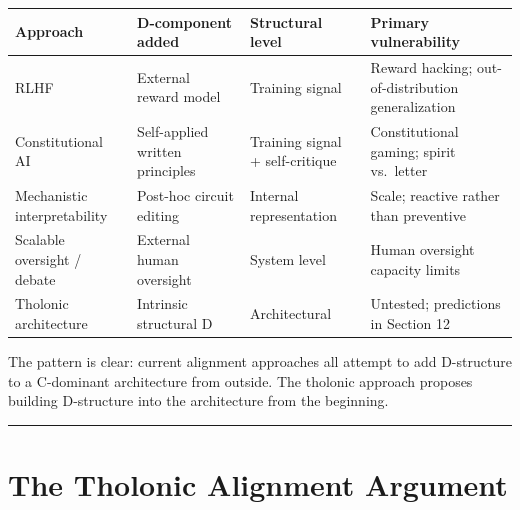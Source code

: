 \documentclass[12pt]{article}
\begin{document}
\begin{longtable}[]{@{}
  >{\raggedright\arraybackslash}p{}
  >{\raggedright\arraybackslash}p{}
  >{\raggedright\arraybackslash}p{}
  >{\raggedright\arraybackslash}p{}@{}}
\toprule\noalign{}
\begin{minipage}[b]{\linewidth}\raggedright
Approach
\end{minipage} & \begin{minipage}[b]{\linewidth}\raggedright
D-component added
\end{minipage} & \begin{minipage}[b]{\linewidth}\raggedright
Structural level
\end{minipage} & \begin{minipage}[b]{\linewidth}\raggedright
Primary vulnerability
\end{minipage} \\
\midrule\noalign{}
\endhead
\bottomrule\noalign{}
\endlastfoot
RLHF & External reward model & Training signal & Reward hacking;
out-of-distribution generalization \\
Constitutional AI & Self-applied written principles & Training signal +
self-critique & Constitutional gaming; spirit vs.~letter \\
Mechanistic interpretability & Post-hoc circuit editing & Internal
representation & Scale; reactive rather than preventive \\
Scalable oversight / debate & External human oversight & System level &
Human oversight capacity limits \\
Tholonic architecture & Intrinsic structural D & Architectural &
Untested; predictions in Section 12 \\
\end{longtable}

The pattern is clear: current alignment approaches all attempt to add
D-structure to a C-dominant architecture from outside. The tholonic
approach proposes building D-structure into the architecture from the
beginning.

\begin{center}\rule{0.5\linewidth}{0.5pt}\end{center}

\section{The Tholonic Alignment Argument}\label{the-tholonic-alignment-argument}
\end{document}
